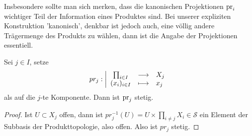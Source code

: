 \begin{remark*}
    Insbesondere sollte man sich merken, dass die kanonischen Projektionen $\operatorname{pr}_i$ wichtiger Teil der Information eines Produktes sind. Bei unserer expliziten Konstruktion 'kanonisch', denkbar ist jedoch auch, eine völlig andere Trägermenge des Produkts zu wählen, dann ist die Angabe der Projektionen essentiell.
\end{remark*}
\begin{dlemmadef}
    Sei $j\in I$, setze
        \begin{equation*}
        pr_j: \left| \begin{array}{c c l} 
        \prod_{i\in I}  & \longrightarrow & X_j \\
        (x_i)_{i \in I} & \longmapsto &  x_j
        \end{array} \right.
    \end{equation*}
    als  auf die $j$-te Komponente. Dann ist $\operatorname{pr}_j$ stetig.
\end{dlemmadef}

    \begin{proof}
        Ist $U\subset X_j$ offen, dann ist $pr_j^{-1}(U) = U\times \prod_{i\neq j} X_i\in \mathcal{S}$ ein Element der Subbasis der Produkttopologie, also offen. Also ist $pr_j$ stetig.
    \end{proof}

